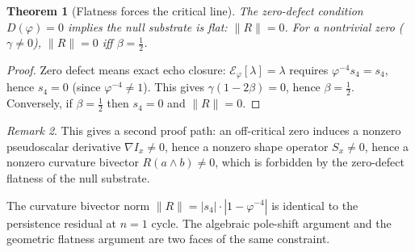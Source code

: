 \documentclass[11pt,a4paper]{article}
\theoremstyle{plain}
\newtheorem{theorem}{Theorem}[section]
\theoremstyle{definition}
\theoremstyle{remark}
\newtheorem{remark}[theorem]{Remark}
\numberwithin{equation}{section}
\newcommand{\vp}{\varphi}
\begin{document}
\medskip

\begin{theorem}[Flatness forces the critical line]
\label{thm:flatness-forces}
The zero-defect condition \(D(\vp)=0\) implies the null substrate
is flat: \(\|R\|=0\).  For a nontrivial zero (\(\gamma\ne0\)),
\(\|R\|=0\) iff \(\beta=\tfrac12\).
\end{theorem}

\begin{proof}
Zero defect means exact echo closure:
\(\mathcal{E}_\vp[\lambda]=\lambda\) requires
\(\vp^{-4}s_4=s_4\), hence \(s_4=0\) (since \(\vp^{-4}\ne1\)).
This gives \(\gamma(1-2\beta)=0\), hence \(\beta=\tfrac12\).
Conversely, if \(\beta=\tfrac12\) then \(s_4=0\) and
\(\|R\|=0\).
\end{proof}

\begin{remark}
This gives a second proof path: an off-critical zero induces a
nonzero pseudoscalar derivative \(\nabla I_x\ne0\), hence a
nonzero shape operator \(S_x\ne0\), hence a nonzero curvature
bivector \(R(a\wedge b)\ne0\), which is forbidden by the
zero-defect flatness of the null substrate.

The curvature bivector norm \(\|R\|=|s_4|\cdot|1-\vp^{-4}|\)
is identical to the persistence residual at \(n=1\) cycle.
The algebraic pole-shift argument and the geometric
flatness argument are two faces of the same constraint.
\end{remark}
\end{document}
